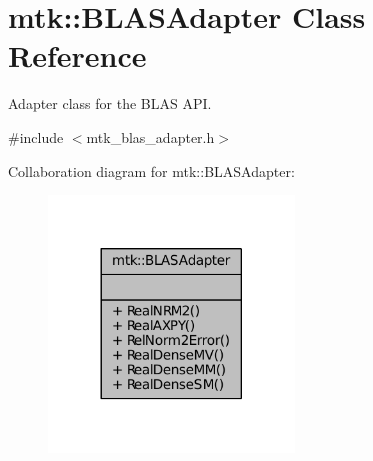 \hypertarget{classmtk_1_1BLASAdapter}{\section{mtk\+:\+:B\+L\+A\+S\+Adapter Class Reference}
\label{classmtk_1_1BLASAdapter}
}


Adapter class for the B\+L\+A\+S A\+P\+I.  




{\ttfamily \#include $<$mtk\+\_\+blas\+\_\+adapter.\+h$>$}



Collaboration diagram for mtk\+:\+:B\+L\+A\+S\+Adapter\+:\nopagebreak
\begin{figure}[H]
\begin{center}
\leavevmode
\includegraphics[width=185pt]{classmtk_1_1BLASAdapter__coll__graph}
\end{center}
\end{figure}
